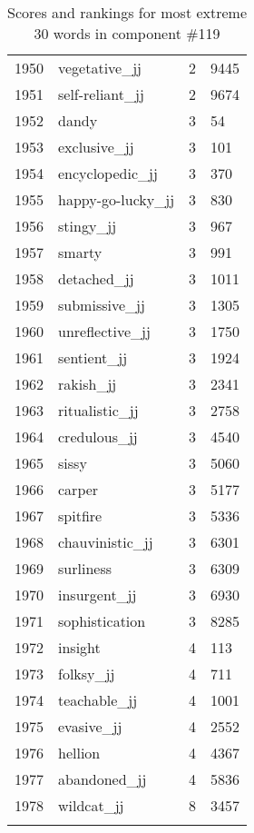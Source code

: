 \begin{longtable}[!htbp]{| rlr@{.}l |}
    1950 & vegetative\_jj & 2 & 9445 \\
    1951 & self-reliant\_jj & 2 & 9674 \\
    1952 & dandy & 3 & 54 \\
    1953 & exclusive\_jj & 3 & 101 \\
    1954 & encyclopedic\_jj & 3 & 370 \\
    1955 & happy-go-lucky\_jj & 3 & 830 \\
    1956 & stingy\_jj & 3 & 967 \\
    1957 & smarty & 3 & 991 \\
    1958 & detached\_jj & 3 & 1011 \\
    1959 & submissive\_jj & 3 & 1305 \\
    1960 & unreflective\_jj & 3 & 1750 \\
    1961 & sentient\_jj & 3 & 1924 \\
    1962 & rakish\_jj & 3 & 2341 \\
    1963 & ritualistic\_jj & 3 & 2758 \\
    1964 & credulous\_jj & 3 & 4540 \\
    1965 & sissy & 3 & 5060 \\
    1966 & carper & 3 & 5177 \\
    1967 & spitfire & 3 & 5336 \\
    1968 & chauvinistic\_jj & 3 & 6301 \\
    1969 & surliness & 3 & 6309 \\
    1970 & insurgent\_jj & 3 & 6930 \\
    1971 & sophistication & 3 & 8285 \\
    1972 & insight & 4 & 113 \\
    1973 & folksy\_jj & 4 & 711 \\
    1974 & teachable\_jj & 4 & 1001 \\
    1975 & evasive\_jj & 4 & 2552 \\
    1976 & hellion & 4 & 4367 \\
    1977 & abandoned\_jj & 4 & 5836 \\
    1978 & wildcat\_jj & 8 & 3457 \\
    \hline
    \caption{Scores and rankings for most extreme 30 words in component \#119} \\
\end{longtable}
